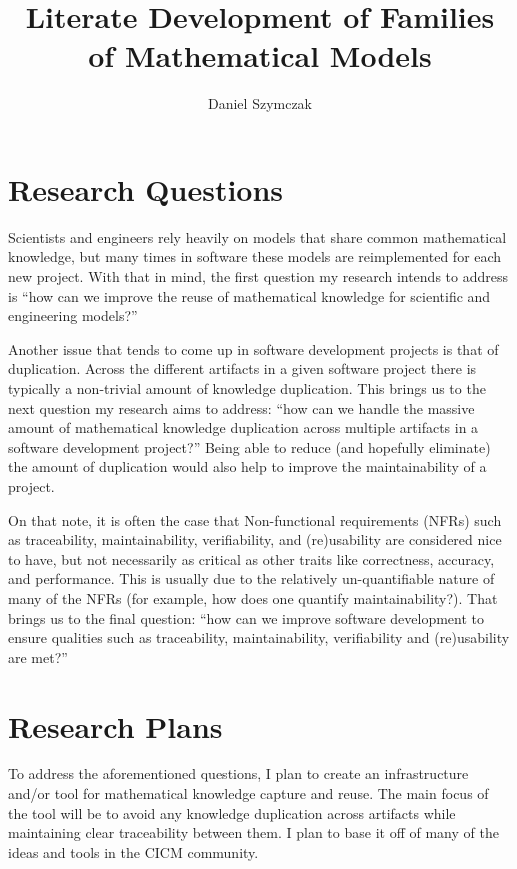 \documentclass[11pt]{article} %
\title{Literate Development of Families of Mathematical Models}
\author{Daniel Szymczak}
\begin{document}
\maketitle

\section{Research Questions}

Scientists and engineers rely heavily on models that share common mathematical
knowledge, but many times in software these models are reimplemented for each
new project. With that in mind, the first question my research intends to
address is ``how can we improve the reuse of mathematical knowledge for
scientific and engineering models?''

Another issue that tends to come up in software development projects is that of
duplication. Across the different artifacts in a given software project
there is typically a non-trivial amount of knowledge duplication. This brings us
to the next question my research aims to address: ``how can we handle the 
massive amount of mathematical knowledge duplication across multiple artifacts
in a software development project?'' Being able to reduce (and hopefully
eliminate) the amount of duplication would also help to improve the 
maintainability of a project.

On that note, it is often the case that Non-functional requirements (NFRs) such
as traceability, maintainability, verifiability, and (re)usability are 
considered nice to have,
but not necessarily as critical as other traits like correctness, accuracy, and
performance. This is usually due to the relatively un-quantifiable nature of 
many of the NFRs (for example, how does one quantify maintainability?). That 
brings us to the final question: ``how can we improve software development to
ensure qualities such as traceability, maintainability, verifiability and
(re)usability are met?''

\section{Research Plans}

To address the aforementioned questions, I plan to create an 
infrastructure and/or tool for mathematical knowledge capture and reuse. The 
main focus of the tool will be to avoid any knowledge duplication across
artifacts while maintaining clear traceability between them. I plan to base it
off of many of the ideas and tools in the CICM community.
\end{document}
